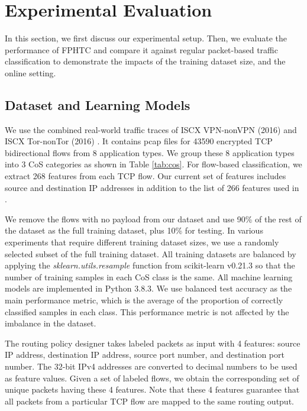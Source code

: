 
\section{Experimental Evaluation}
\label{sec:results}

In this section, we first discuss our experimental setup. Then, we evaluate the performance of FPHTC and compare it against regular packet-based traffic classification to demonstrate the impacts of the training dataset size, and the online setting.

\subsection{Dataset and Learning Models}

We use the combined real-world traffic traces of ISCX VPN-nonVPN (2016) \cite{Vpn16, Vpn_url} and ISCX Tor-nonTor (2016) \cite{Tor17, Tor_url}. It contains pcap files for 43590 encrypted TCP bidirectional flows from 8 application types. We group these 8 application types into 3 CoS categories as shown in Table \ref{tab:cos}. For flow-based classification, we extract 268 features from each TCP flow. Our current set of features includes source and destination IP addresses in addition to the list of 266 features used in \cite{Chowdhury19}. 

We remove the flows with no payload from our dataset and use 90\% of the rest of the dataset as the full training dataset, plus 10\% for testing. In various experiments that require different training dataset sizes, we use a randomly selected subset of the full training dataset. All training datasets are balanced by applying the \textit{sklearn.utils.resample} function from scikit-learn v0.21.3 \cite{sklearn} so that the number of training samples in each CoS class is the same. All machine learning models are implemented in Python 3.8.3. We use balanced test accuracy as the main performance metric, which is the  average of the proportion of correctly classified samples in each class. This performance metric is not affected by the imbalance in the dataset.

The routing policy designer takes labeled packets as input with 4 features: source IP address, destination IP address, source port number, and destination port number. The 32-bit IPv4 addresses are converted to decimal numbers to be used as feature values. Given a set of labeled flows, we obtain the corresponding set of unique packets having these 4 features. Note that these 4 features guarantee that all packets from a particular TCP flow are mapped to the same routing output.

